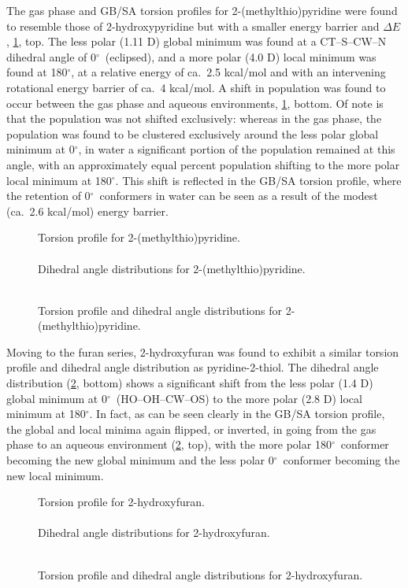 \documentclass[12pt]{report}
\def\deg{$^{\circ}$}
\begin{document}
The gas phase and GB/SA torsion profiles for 2-(methylthio)pyridine were found to resemble those of 2-hydroxypyridine but with a smaller energy barrier and $\Delta E$, \cref{dihp6smegb}, top. The less polar (1.11 D) global minimum was found at a CT--S--CW--N dihedral angle of 0\deg\ (eclipsed), and a more polar (4.0 D) local minimum was found at 180\deg, at a relative energy of ca.\ 2.5 kcal/mol and with an intervening rotational energy barrier of ca.\ 4 kcal/mol. A shift in population was found to occur between the gas phase and aqueous environments, \cref{dihp6smegb}, bottom. Of note is that the population was not shifted exclusively: whereas in the gas phase, the population was found to be clustered exclusively around the less polar global minimum at 0\deg, in water a significant portion of the population remained at this angle, with an approximately equal percent population shifting to the more polar local minimum at 180\deg. This shift is reflected in the GB/SA torsion profile, where the retention of 0\deg\ conformers in water can be seen as a result of the modest (ca.\ 2.6 kcal/mol) energy barrier.

\begin{figure}[htbp]
\centering
Torsion profile for 2-(methylthio)pyridine.\\
\\
Dihedral angle distributions for 2-(methylthio)pyridine.\\
\\
\caption{Torsion profile and dihedral angle distributions for 2-(methylthio)pyridine.}
\label{dihp6smegb}
\end{figure}

Moving to the furan series, 2-hydroxyfuran was found to exhibit a similar torsion profile and dihedral angle distribution as pyridine-2-thiol. The dihedral angle distribution (\cref{dihfohgb}, bottom) shows a significant shift from the less polar (1.4 D) global minimum at 0\deg\ (HO--OH--CW--OS) to the more polar (2.8 D) local minimum at 180\deg. In fact, as can be seen clearly in the GB/SA torsion profile, the global and local minima again flipped, or inverted, in going from the gas phase to an aqueous environment (\cref{dihfohgb}, top), with the more polar 180\deg\ conformer becoming the new global minimum and the less polar 0\deg\ conformer becoming the new local minimum.

\begin{figure}[htbp]
\centering
Torsion profile for 2-hydroxyfuran.\\
\\
Dihedral angle distributions for 2-hydroxyfuran.\\
\\
\caption{Torsion profile and dihedral angle distributions for 2-hydroxyfuran.}
\label{dihfohgb}
\end{figure}
\end{document}
